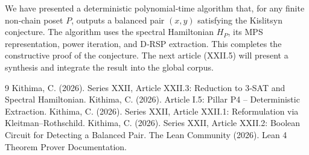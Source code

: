 \documentclass[11pt,a4paper]{article}
\begin{document}
We have presented a deterministic polynomial‑time algorithm that, for any finite non‑chain poset $P$, outputs a balanced pair $(x,y)$ satisfying the Kislitsyn conjecture. The algorithm uses the spectral Hamiltonian $H_P$, its MPS representation, power iteration, and D‑RSP extraction. This completes the constructive proof of the conjecture. The next article (XXII.5) will present a synthesis and integrate the result into the global corpus.


\begin{thebibliography}{9}
  Kithima, C. (2026). Series XXII, Article XXII.3: Reduction to 3‑SAT and Spectral Hamiltonian.
  Kithima, C. (2026). Article I.5: Pillar P4 – Deterministic Extraction.
  Kithima, C. (2026). Series XXII, Article XXII.1: Reformulation via Kleitman–Rothschild.
  Kithima, C. (2026). Series XXII, Article XXII.2: Boolean Circuit for Detecting a Balanced Pair.
  The Lean Community (2026). Lean 4 Theorem Prover Documentation.
\end{thebibliography}
\end{document}
